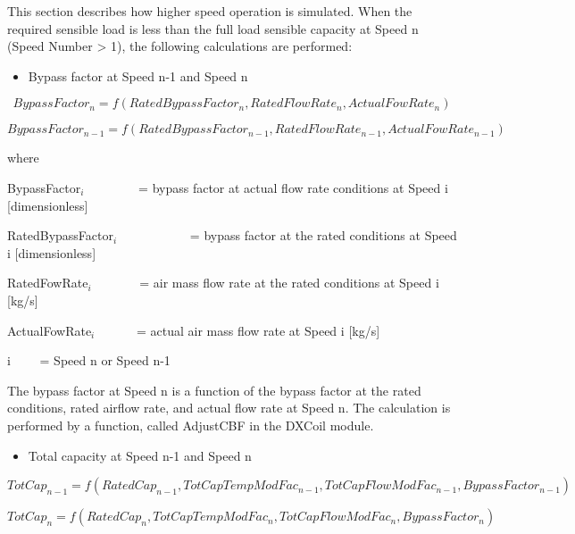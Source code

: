This section describes how higher speed operation is simulated. When the required sensible load is less than the full load sensible capacity at Speed n (Speed Number \textgreater{} 1), the following calculations are performed:

\begin{itemize}
  \item Bypass factor at Speed n-1 and Speed n
\end{itemize}

\begin{equation}
BypassFacto{r_n} = f(RatedBypassFacto{r_n},RatedFlowRat{e_n},ActualFowRat{e_n})
\end{equation}

\begin{equation}
BypassFacto{r_{n - 1}} = f(RatedBypassFacto{r_{n - 1}},RatedFlowRat{e_{n - 1}},ActualFowRat{e_{n - 1}})
\end{equation}

where

BypassFactor\(_{i}\)~~~~~~~~ = bypass factor at actual flow rate conditions at Speed i {[}dimensionless{]}

RatedBypassFactor\(_{i}\)~~~~~~~~~~~ = bypass factor at the rated conditions at Speed i {[}dimensionless{]}

RatedFowRate\(_{i}\)~~~~~~~ = air mass flow rate at the rated conditions at Speed i {[}kg/s{]}

ActualFowRate\(_{i}\)~~~~~~ = actual air mass flow rate at Speed i {[}kg/s{]}

i~~~~ = Speed n or Speed n-1

The bypass factor at Speed n is a function of the bypass factor at the rated conditions, rated airflow rate, and actual flow rate at Speed n. The calculation is performed by a function, called AdjustCBF in the DXCoil module.

\begin{itemize}
  \item Total capacity at Speed n-1 and Speed n
\end{itemize}

\begin{equation}
  TotCa{p_{n - 1}} = f(RatedCa{p_{n - 1}},TotCapTempModFa{c_{n - 1}},TotCapFlowModFa{c_{n - 1}},BypassFacto{r_{n - 1}})
\end{equation}

\begin{equation}
 TotCa{p_n} = f(RatedCa{p_n},TotCapTempModFa{c_n},TotCapFlowModFa{c_n},BypassFacto{r_n})
\end{equation}

